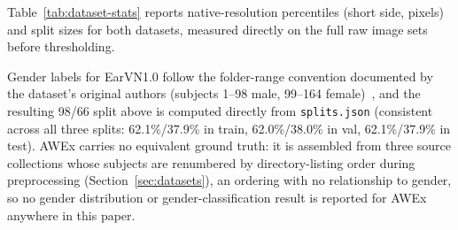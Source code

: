 \documentclass[11pt]{article}
\begin{document}
Table~\ref{tab:dataset-stats} reports native-resolution percentiles (short side, pixels) and split sizes for both datasets, measured directly on the full raw image sets before thresholding.

\begin{table}[H]
\centering
\caption{Descriptive statistics for both datasets (native short-side resolution percentiles and split sizes), measured on the full raw image sets.}
\label{tab:dataset-stats}
\end{table}
Gender labels for EarVN1.0 follow the folder-range convention documented by the dataset's original authors (subjects 1--98 male, 99--164 female)~\cite{hoang2019earvn}, and the resulting 98/66 split above is computed directly from \texttt{splits.json} (consistent across all three splits: 62.1\%/37.9\% in train, 62.0\%/38.0\% in val, 62.1\%/37.9\% in test). AWEx carries no equivalent ground truth: it is assembled from three source collections whose subjects are renumbered by directory-listing order during preprocessing (Section~\ref{sec:datasets}), an ordering with no relationship to gender, so no gender distribution or gender-classification result is reported for AWEx anywhere in this paper.
\end{document}

